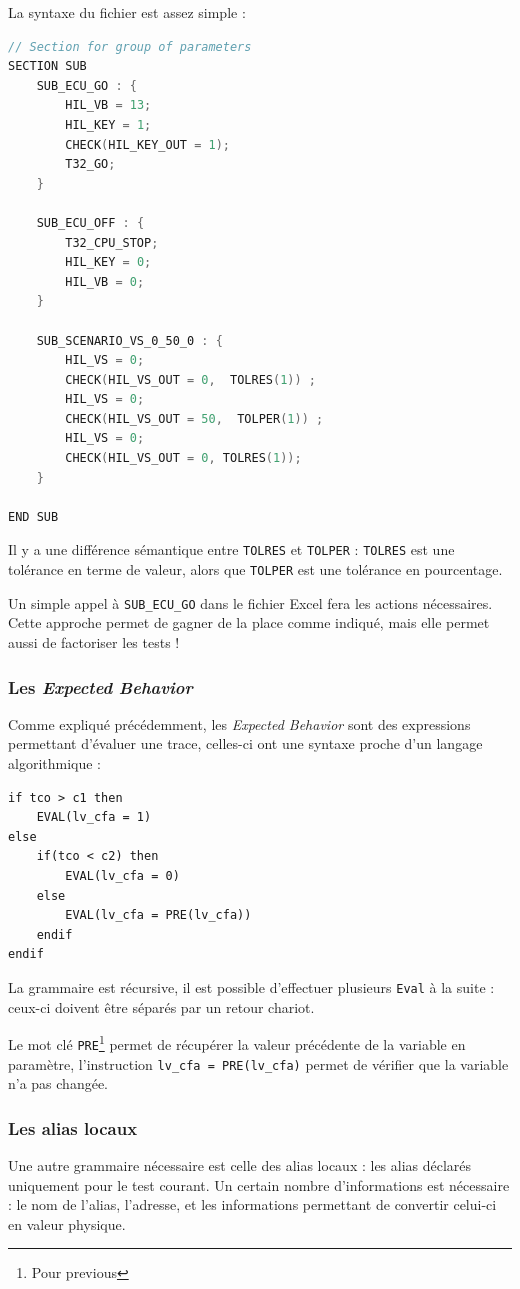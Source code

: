 	La syntaxe du fichier est assez simple :
\begin{lstlisting}[caption=Exemple de fichier cnf, language=C]
// Section for group of parameters
SECTION SUB
	SUB_ECU_GO : {
		HIL_VB = 13;
 		HIL_KEY = 1;
		CHECK(HIL_KEY_OUT = 1);
		T32_GO;
	}

	SUB_ECU_OFF : {
		T32_CPU_STOP;
 		HIL_KEY = 0;
		HIL_VB = 0;
	}

	SUB_SCENARIO_VS_0_50_0 : {
		HIL_VS = 0;
		CHECK(HIL_VS_OUT = 0,  TOLRES(1)) ;
		HIL_VS = 0;
		CHECK(HIL_VS_OUT = 50,  TOLPER(1)) ;
		HIL_VS = 0;
		CHECK(HIL_VS_OUT = 0, TOLRES(1));
	}

END SUB
\end{lstlisting}
\begin{remarque}
Il y a une différence sémantique entre \texttt{TOLRES} et \texttt{TOLPER} : \texttt{TOLRES} est une tolérance en terme de valeur, alors que \texttt{TOLPER} est une tolérance en pourcentage. 
\end{remarque}
Un simple appel à \texttt{SUB\_ECU\_GO} dans le fichier Excel fera les actions nécessaires. Cette approche permet de gagner de la place comme indiqué, mais elle permet aussi de factoriser les tests !

	\subsubsection{Les \textit{Expected Behavior}}
Comme expliqué précédemment, les \textit{Expected Behavior} sont des expressions permettant d'évaluer une trace, celles-ci ont une syntaxe proche d'un langage algorithmique : 
\begin{lstlisting}[caption=Exemple d'expected Behavior, language=Algo]
if tco > c1 then 
	EVAL(lv_cfa = 1)
else
	if(tco < c2) then 
		EVAL(lv_cfa = 0)
	else           
		EVAL(lv_cfa = PRE(lv_cfa))
	endif
endif
\end{lstlisting}
La grammaire est récursive, il est possible d'effectuer plusieurs \texttt{Eval} à la suite : ceux-ci doivent être séparés par un retour chariot.

Le mot clé \texttt{PRE}\footnote{Pour previous} permet de récupérer la valeur précédente de la variable en paramètre, l'instruction \texttt{lv\_cfa = PRE(lv\_cfa)} permet de vérifier que la variable n'a pas changée.

\subsubsection{Les alias locaux}
Une autre grammaire nécessaire est celle des alias locaux : les alias déclarés uniquement pour le test courant. Un certain nombre d'informations est nécessaire : le nom de l'alias, l'adresse, et les informations permettant de convertir celui-ci en valeur physique.

